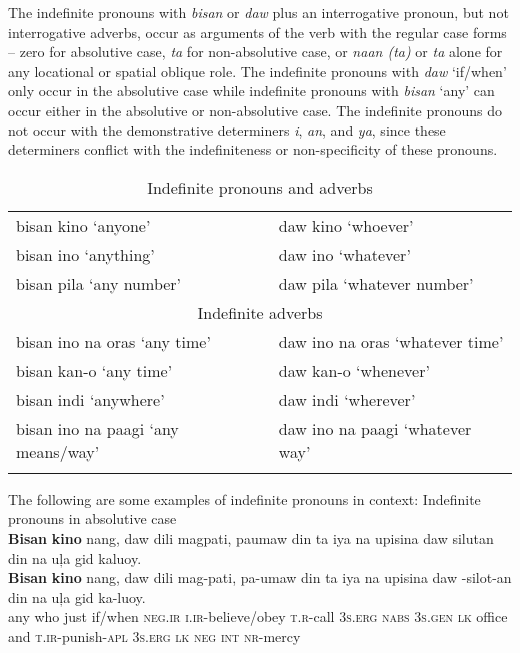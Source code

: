 The indefinite pronouns with \textit{bisan} or \textit{daw} plus an interrogative pronoun, but not interrogative adverbs, occur as arguments of the verb with the regular case forms – zero for absolutive case, \textit{ta} for non-absolutive case, or \textit{naan (ta)} or \textit{ta} alone for any locational or spatial oblique role. The indefinite pronouns with \textit{daw} ‘if/when’ only occur in the absolutive case while indefinite pronouns with \textit{bisan} ‘any’ can occur either in the absolutive or non-absolutive case. The indefinite pronouns do not occur with the demonstrative determiners \textit{i}, \textit{an}, and \textit{ya}, since these determiners conflict with the indefiniteness or non-specificity of these pronouns.

\begin{table}
\label{indefinitepronouns}
\caption{Indefinite pronouns and adverbs}
\begin{tabularx}{\textwidth}{Xl}
\lsptoprule
\multicolumn{2}{c}{Indefinite pronouns} \\
\midrule
bisan kino    ‘anyone’ & daw kino  ‘whoever’ \\
bisan ino    ‘anything’ & daw ino  ‘whatever’ \\
bisan pila    ‘any number’ & daw pila   ‘whatever number’ \\
\midrule
\multicolumn{2}{c}{{Indefinite adverbs}} \\
\midrule
bisan ino na oras  ‘any time’  & daw ino na oras   ‘whatever time’ \\
bisan kan-o `any time' & daw kan-o  ‘whenever’ \\
bisan indi    ‘anywhere’ & daw indi  ‘wherever’ \\
bisan ino na paagi  ‘any means/way’ & daw ino na paagi ‘whatever way’ \\
\lspbottomrule
\end{tabularx}
\end{table}
The following are some examples of indefinite pronouns in context:
\ea
Indefinite pronouns in absolutive case \\
\textbf{Bisan}  \textbf{kino}  nang,  daw  dili  magpati,  paumaw  din  ta iya  na  upisina  daw  silutan  din  na  uļa  gid  kaluoy. \\\smallskip
 \gll \textbf{Bisan}  \textbf{kino}  nang,  daw  dili  mag-pati,  pa-umaw  din  ta iya  na  upisina  daw  \emptyset{}-silot-an  din  na  uļa  gid  ka-luoy. \\
any  who  just  if/when  \textsc{neg.ir}  \textsc{i.ir}-believe/obey  \textsc{t.r}-call  3\textsc{s.erg}  \textsc{nabs} 3\textsc{s.gen}  \textsc{lk}  office  and \textsc{t.ir}-punish\textsc{-apl}  3\textsc{s.erg}  \textsc{lk}  \textsc{neg}  \textsc{int}  \textsc{nr}-mercy \\

